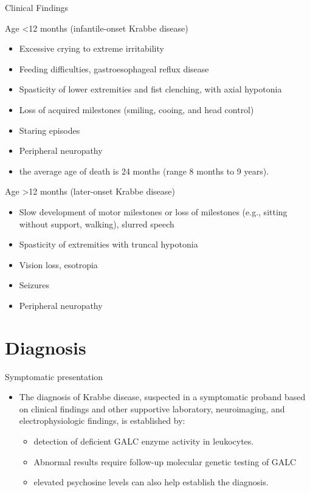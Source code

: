 \documentclass[presentation, smaller]{beamer}
\begin{document}
\begin{frame}[label={sec:org0a86f3e}]{Clinical Findings}
\begin{block}{Age <12 months (infantile-onset Krabbe disease)}
\small
\begin{itemize}
\item Excessive crying to extreme irritability
\item Feeding difficulties, gastroesophageal reflux disease
\item Spasticity of lower extremities and fist clenching, with axial hypotonia
\item Loss of acquired milestones (smiling, cooing, and head control)
\item Staring episodes
\item Peripheral neuropathy
\item the average age of death is 24 months (range 8 months to 9 years).
\end{itemize}
\end{block}

\begin{block}{Age >12 months (later-onset Krabbe disease)}
\small
\begin{itemize}
\item Slow development of motor milestones or loss of milestones (e.g.,
sitting without support, walking), slurred speech
\item Spasticity of extremities with truncal hypotonia
\item Vision loss, esotropia
\item Seizures
\item Peripheral neuropathy
\end{itemize}
\end{block}
\end{frame}

\section{Diagnosis}
\label{sec:orgc84e4e2}
\begin{frame}[label={sec:org46c7836}]{Symptomatic presentation}
\begin{itemize}
\item The diagnosis of Krabbe disease, suspected in a symptomatic proband
based on clinical findings and other supportive laboratory,
neuroimaging, and electrophysiologic findings, is established by:
\begin{itemize}
\item detection of deficient GALC enzyme activity in leukocytes.
\item Abnormal results require follow-up molecular genetic testing of GALC
\item elevated psychosine levels can also help establish the diagnosis.
\end{itemize}
\end{itemize}
\end{frame}
\end{document}
